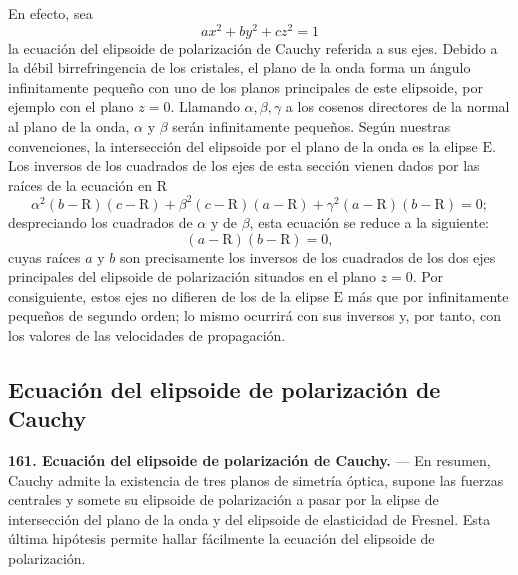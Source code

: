 En efecto, sea
\[
ax^2+by^2+cz^2=1
\]
la ecuación del elipsoide de polarización de Cauchy referida a sus ejes.
Debido a la débil birrefringencia de los cristales, el plano de la onda
forma un ángulo infinitamente pequeño con uno de los planos principales de
este elipsoide, por ejemplo con el plano $z=0$. Llamando
$\alpha,\beta,\gamma$ a los cosenos directores de la normal al plano de la
onda, $\alpha$ y $\beta$ serán infinitamente pequeños. Según nuestras
convenciones, la intersección del elipsoide por el plano de la onda es la
elipse $\mathrm E$. Los inversos de los cuadrados de los ejes de esta
sección vienen dados por las raíces de la ecuación en $\mathrm R$
\[
\alpha^2(b-\mathrm R)(c-\mathrm R)+\beta^2(c-\mathrm R)(a-\mathrm R)+\gamma^2(a-\mathrm R)(b-\mathrm R)=0;
\]
despreciando los cuadrados de $\alpha$ y de $\beta$, esta ecuación se
reduce a la siguiente:
\[
(a-\mathrm R)(b-\mathrm R)=0,
\]
cuyas raíces $a$ y $b$ son precisamente los inversos de los cuadrados de
los dos ejes principales del elipsoide de polarización situados en el
plano $z=0$. Por consiguiente, estos ejes no difieren de los de la elipse
$\mathrm E$ más que por infinitamente pequeños de segundo orden; lo mismo
ocurrirá con sus inversos y, por tanto, con los valores de las velocidades
de propagación.

\subsection{Ecuación del elipsoide de polarización de Cauchy}

\noindent\textbf{161. Ecuación del elipsoide de polarización de Cauchy.}
— En resumen, Cauchy admite la existencia de tres planos de simetría
óptica, supone las fuerzas centrales y somete su elipsoide de polarización
a pasar por la elipse de intersección del plano de la onda y del
elipsoide de elasticidad de Fresnel. Esta última hipótesis permite hallar
fácilmente la ecuación del elipsoide de polarización.

